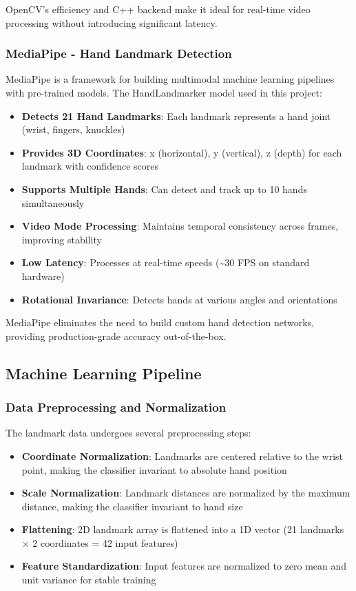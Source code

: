 OpenCV's efficiency and C++ backend make it ideal for real-time video processing without introducing significant latency.

\subsubsection{MediaPipe - Hand Landmark Detection}

MediaPipe is a framework for building multimodal machine learning pipelines with pre-trained models. The HandLandmarker model used in this project:

\begin{itemize}
    \item \textbf{Detects 21 Hand Landmarks}: Each landmark represents a hand joint (wrist, fingers, knuckles)
    \item \textbf{Provides 3D Coordinates}: x (horizontal), y (vertical), z (depth) for each landmark with confidence scores
    \item \textbf{Supports Multiple Hands}: Can detect and track up to 10 hands simultaneously
    \item \textbf{Video Mode Processing}: Maintains temporal consistency across frames, improving stability
    \item \textbf{Low Latency}: Processes at real-time speeds (\textasciitilde 30 FPS on standard hardware)
    \item \textbf{Rotational Invariance}: Detects hands at various angles and orientations
\end{itemize}

MediaPipe eliminates the need to build custom hand detection networks, providing production-grade accuracy out-of-the-box.

\subsection{Machine Learning Pipeline}

\subsubsection{Data Preprocessing and Normalization}

The landmark data undergoes several preprocessing steps:

\begin{itemize}
    \item \textbf{Coordinate Normalization}: Landmarks are centered relative to the wrist point, making the classifier invariant to absolute hand position
    \item \textbf{Scale Normalization}: Landmark distances are normalized by the maximum distance, making the classifier invariant to hand size
    \item \textbf{Flattening}: 2D landmark array is flattened into a 1D vector (21 landmarks × 2 coordinates = 42 input features)
    \item \textbf{Feature Standardization}: Input features are normalized to zero mean and unit variance for stable training
\end{itemize}

